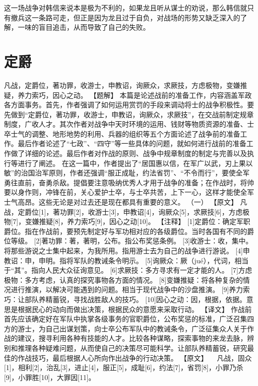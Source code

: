 \documentclass[a4paper,12pt,UTF8,twoside]{ctexbook}
\begin{document}
这一场战争对韩信来说本是极为不利的，如果龙且听从谋士的劝说，那么韩信就只有撤兵这一条路可走，但正是因为龙且过于自负，对战场的形势又缺乏深入的了解，一味的盲目追击，从而导致了自己的失败。


\chapter{定爵}

凡战，定爵位，著功罪，收游士，申教诏，询厥众，求厥技，方虑极物，变嫌推疑，养力索巧，因心之动。
【题解】
本篇是论述战前的准备工作，内容涵盖军政各方面事务。首先，作者强调了如何运用赏罚的手段来调动将士的战争积极性。要先做到“定爵位，著功罪，收游士，申教诏，询厥众，求厥技”，在交战前制定规章制度，广收人才。其次作者对战争中天时环境的运用、钱财等物质资源的准备、士卒士气的调整、地形地势的利用、兵器的组织等五个方面论述了战争前的准备工作。最后作者论述了“七政”、“四守”等一些具体的问题，就如何进行战前的准备工作做了详细的论述。最后作者对作战的原则、战争中规章制度的制定与完善以及执行等进行了阐述。
在这一篇中，作者提出了“居国惠以信，在军广以武，刃上果以敏”的治国治军原则，作者还强调“服正成耻，约法省罚”、“不令而行”，要使全军勇往直前，奋勇杀敌。提倡要注意吸纳优秀人才用于战争的准备；在作战时，将帅要以身作则，冲锋在前，关心爱护士卒，与士卒共苦，上下一心，这样才能使全军士气高昂。这些无论是对过去还是现在都具有重要的意义。
（一）
【原文】
凡战，定爵位[1]，著功罪[2]，收游士[3]，申教诏[4]，询厥众[5]，求厥技[6]，方虑极物[7]，变嫌推疑[8]，养力索巧[9]，因心之动[10]。
【注释】
[1]定爵位：确定军职爵位。指在作战前，要预先制定好与军功相对应的各级爵位。当时各国有不同的爵位等级。
[2]著功罪：著，著明，公布。指公布奖惩条例。
[3]收游士：收，集中。将那些游说之士集中起来，为我所用。指用游士去为自己的战争进行游说。
[4]申教诏：申，申明。指将军队的教诫条令明示。
[5]询厥众：厥（jué），代词，相当于“其”。指向人民大众征询意见。
[6]求厥技：多方寻求有一定才能的人。
[7]方虑极物：多方考虑，认真的探究事物各方面的情况。
[8]变嫌推疑：将各种复杂的情况进行推演，以解决可能遇到的问题。相当于现代战争中的沙盘推演。
[9]养力索巧：让部队养精蓄锐，寻找战胜敌人的技巧。
[10]因心之动：因，根据，依据。意思是根据民心的动向而做出决策，根据民众的意愿来采取行动。
【译文】
作战前首先应该确定好在军队中执掌各级事务的官职爵位，公布奖惩的标准，广泛召集四方的游士，为自己出谋划策，向士卒公布军队中的教诫条令，广泛征集众人关于作战的建议，搜寻利用各种有技能的人才。比较各种谋略，探索事物的来龙去脉，辨别和推理各种疑难问题，从而使自己的决策尽可能科学。让部队养精蓄锐，研究最佳的作战技巧，最后根据人心所向作出战争的行动决策。
【原文】
　凡战，固众[1]，相利[2]，治乱[3]，进止[4]，服正[5]，成耻[6]，约法[7]，省罚[8]，小罪乃杀[9]，小罪胜[10]，大罪因[11]。
\end{document}
